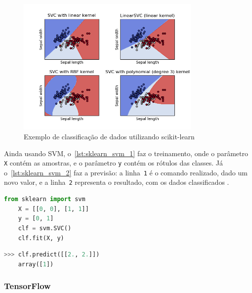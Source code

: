 \begin{figure}[ht]
	\caption{\label{fig:sklearn_svm}Exemplo de classificação de dados utilizando scikit-learn}
	\begin{center}
	    \includegraphics[width=0.8\textwidth]{resources/sklearn_iris_svm.png}
	\end{center}
\end{figure}

Ainda usando SVM, o~\autoref{lst:sklearn_svm_1} faz o treinamento, onde o parâmetro \texttt{X} contém as amostras, e o parâmetro \texttt{y} contém os rótulos das classes. Já o~\autoref{lst:sklearn_svm_2} faz a previsão: a linha~\texttt{1} é o comando realizado, dado um novo valor, e a linha~\texttt{2} representa o resultado, com os dados classificados \cite{scikitlearn:svm_classif}.

\begin{lstlisting}[language=Python,caption={Treino do classificador SVM com scikit-learn},label={lst:sklearn_svm_1}]
	from sklearn import svm
	X = [[0, 0], [1, 1]]
	y = [0, 1]
	clf = svm.SVC()
	clf.fit(X, y)
\end{lstlisting}

\begin{lstlisting}[language=Python,caption={Previsão usando classificador SVM com scikit-learn},label={lst:sklearn_svm_2}]
	>>> clf.predict([[2., 2.]])
	array([1])
\end{lstlisting}

\subsubsection{TensorFlow}\label{sec:ml_tf}

